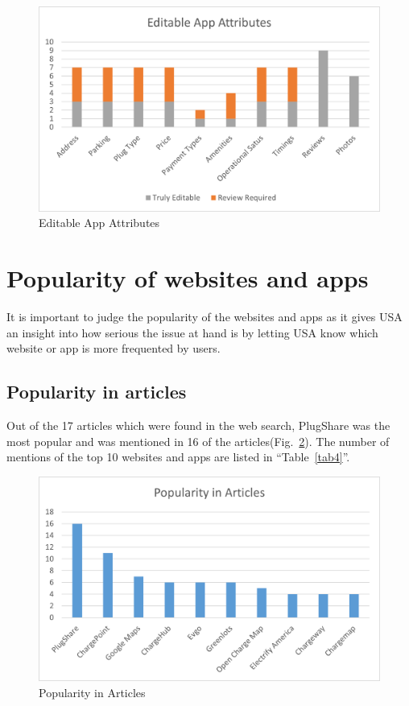 \documentclass[conference]{IEEEtran}
\begin{document}
\begin{figure}[htbp]
\centerline{\includegraphics[width=\columnwidth]{Picture4.png}}
\caption{Editable App Attributes}
\label{fig4}
\end{figure}

\section{Popularity of websites and apps}
It is important to judge the popularity of the websites and apps as it gives USA an insight into how serious the issue at hand is by letting USA know which website or app is more frequented by users.

\subsection{Popularity in articles}
Out of the 17 articles which were found in the web search, PlugShare was the most popular and was mentioned in 16 of the articles(Fig.~\ref{fig5}). The number of mentions of the top 10 websites and apps are listed in ``Table~\ref{tab4}''.

\begin{figure}[htbp]
\centerline{\includegraphics[width=\columnwidth]{Picture5.png}}
\caption{Popularity in Articles}
\label{fig5}
\end{figure}
\end{document}
